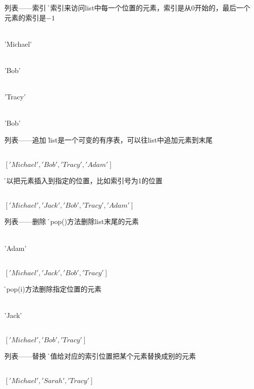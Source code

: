 \begin{frame}[fragile]{列表——索引}
  \h 用索引来访问list中每一个位置的元素，索引是从$0$开始的，最后一个元素的索引是$-1$

   \\  
  'Michael'

   \\  
  'Bob'  

   \\
  'Tracy'

   \\
  'Bob'
\end{frame}


\begin{frame}[fragile]{列表——追加}
    \h list是一个可变的有序表，可以往list中追加元素到末尾


     \\  
    $['Michael', 'Bob', 'Tracy', 'Adam']$
    

    \h 可以把元素插入到指定的位置，比如索引号为1的位置


     \\ 
    $['Michael', 'Jack', 'Bob', 'Tracy', 'Adam']$
\end{frame}

\begin{frame}[fragile]{列表——删除}
  \h 用pop()方法删除list末尾的元素

   \\ 
  'Adam'

   \\ 
  $['Michael', 'Jack', 'Bob', 'Tracy']$


  \h 用pop(i)方法删除指定位置的元素

   \\ 
  'Jack'

   \\ 
  $['Michael', 'Bob', 'Tracy']$
\end{frame}

\begin{frame}[fragile]{列表——替换}
  \h 赋值给对应的索引位置把某个元素替换成别的元素


   \\ 
  $['Michael', 'Sarah', 'Tracy']$
\end{frame}


